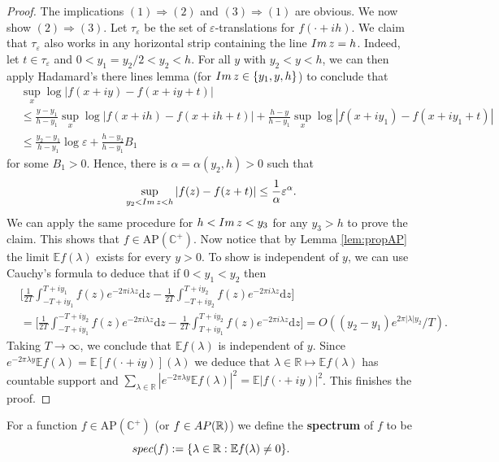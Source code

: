 \documentclass[a4paper,reqno,12pt]{amsart}
\newcommand{\E}{\mathcal{E}}
\renewcommand{\H}{\mathbb{C}^+}
\renewcommand{\r}{\mathbb{R}}
\newcommand{\la}{\lambda}
\newcommand{\al}{\alpha}
\newcommand{\ep}{\varepsilon}
\renewcommand{\d}{\mathrm{d}}
\newcommand{\1}{{\bf 1}}
\newcommand{\apc}{\mathrm{AP}(\H)}
\renewcommand{\E}{\mathbb{E}}
\renewcommand{\emph}[1]{{\bf #1}}
\newcommand{\apr}{{\rm AP}(\r)}
\renewcommand{\1}{{\bo 1}}
\renewcommand{\Im}{{\rm Im}\,}
\newcommand{\spec}{{\rm spec}}
\begin{document}
\begin{proof}
The implications $(1)\Rightarrow (2)$ and $(3)\Rightarrow (1)$ are obvious. We now show $(2)\Rightarrow (3)$. Let $\tau_\ep$ be the set of $\ep$-translations for $f(\cdot + ih)$. We claim that $\tau_\ep$ also works in any horizontal strip containing the line $\Im z=h$. Indeed, let $t\in \tau_\ep$ and $0<y_1=y_2/2<y_2<h$. For all $y$ with $y_2<y<h$, we can then apply Hadamard's there lines lemma (for $\Im z\in \{y_1,y,h\}$) to conclude that
\begin{align*}
& \sup_x \log |f(x + iy)-f(x + iy+t)| \\ & \leq \frac{y-y_1}{h-y_1}\sup_x \log |f(x + ih)-f(x + ih+t)| +\frac{h-y}{h-y_1} \sup_x \log |f(x + iy_1)-f(x + iy_1+t)| \\
& \leq \frac{y_2-y_1}{h-y_1}\log \ep +\frac{h-y_2}{h-y_1} B_1
\end{align*}
for  some $B_1>0$. Hence, there is $\al=\al(y_2,h)>0$ such that
$$
\sup_{y_2<\Im z<h} |f(z)-f(z+t)| \leq \frac{1}{\al}\ep^\al.
$$
We can apply the same procedure for $h<\Im z<y_3$ for any $y_3>h$ to prove the claim. This shows that $f\in \apc$. Now notice that by Lemma \ref{lem:propAP} the limit $\E f(\la)$ exists for every $y>0$. To show is independent of $y$, we can use Cauchy's formula to deduce that if $0<y_1<y_2$ then
\begin{align*}
&\bigg[\frac{1}{2T}\int_{-T+iy_1}^{T+iy_1} f(z)e^{-2\pi i \la z}\d z -  \frac{1}{2T}\int_{-T+iy_2}^{T+iy_2} f(z)e^{-2\pi i \la z}\d z \bigg]  \\ & = 
\bigg[\frac{1}{2T}\int_{-T+iy_1}^{-T+iy_2} f(z)e^{-2\pi i \la z}\d z -  \frac{1}{2T}\int_{T+iy_1}^{T+iy_2} f(z)e^{-2\pi i \la z}\d z \bigg] = O((y_2-y_1)e^{2\pi |\la|y_2}/T).
\end{align*}
Taking $T\to\infty$, we conclude that $\E f(\la)$ is independent of $y$. Since $e^{-2\pi \la y}\E f(\la) = \E [f(\cdot +i y)](\la)$ we deduce that $\la \in \r \mapsto \E f(\la)$ has countable support and  $\sum_{\la\in \r}|e^{-2\pi \la y}\E f(\la)|^2 =  \E |f(\cdot +i y)|^2$. This finishes the proof.
\end{proof}

For a function $f\in \apc$ (or $f\in \apr$) we define the \emph{spectrum} of $f$ to be 
$$
\spec(f):=\{\la\in \r : \E f(\la)\neq 0\}.
$$
\end{document}
